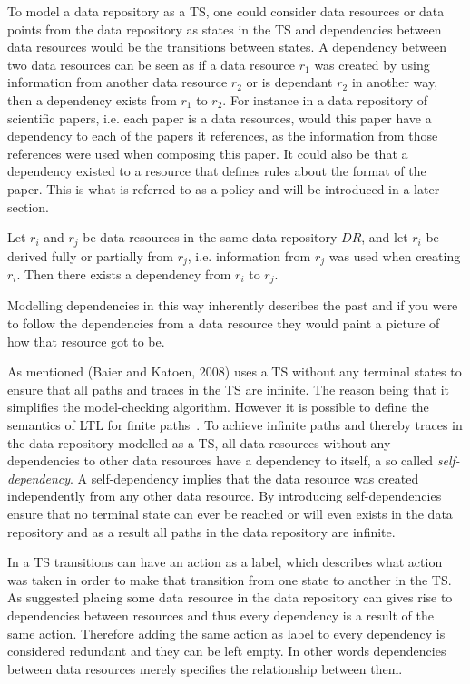 To model a data repository as a TS, one could consider data resources or data points from the data repository as states in the TS and dependencies between data resources would be the transitions between states. A dependency between two data resources can be seen as if a data resource $r_1$ was created by using information from another data resource $r_2$ or is dependant $r_2$ in another way, then a dependency exists from $r_1$ to $r_2$. For instance in a data repository of scientific papers, i.e. each paper is a data resources, would this paper have a dependency to each of the papers it references, as the information from those references were used when composing this paper. It could also be that a dependency existed to a resource that defines rules about the format of the paper. This is what is referred to as a policy and will be introduced in a later section.
\begin{definition}
Let $r_i$ and $r_j$ be data resources in the same data repository $DR$, and let $r_i$ be derived fully or partially from $r_j$, i.e. information from $r_j$ was used when creating $r_i$. Then there exists a dependency from $r_i$ to $r_j$.
\end{definition}
Modelling dependencies in this way inherently describes the past and if you were to follow the dependencies from a data resource they would paint a picture of how that resource got to be.

As mentioned (Baier and Katoen, 2008) uses a TS without any terminal states to ensure that all paths and traces in the TS are infinite. The reason being that it simplifies the model-checking algorithm. However it is possible to define the semantics of LTL for finite paths~\cite{baier2008principles}. To achieve infinite paths and thereby traces in the data repository modelled as a TS, all data resources without any dependencies to other data resources have a dependency to itself, a so called \emph{self-dependency}. A self-dependency implies that the data resource was created independently from any other data resource. By introducing self-dependencies ensure that no terminal state can ever be reached or will even exists in the data repository and as a result all paths in the data repository are infinite.

In a TS transitions can have an action as a label, which describes what action was taken in order to make that transition from one state to another in the TS. As suggested placing some data resource in the data repository can gives rise to dependencies between resources and thus every dependency is a result of the same action. Therefore adding the same action as label to every dependency is considered redundant and they can be left empty. In other words dependencies between data resources merely specifies the relationship between them.


